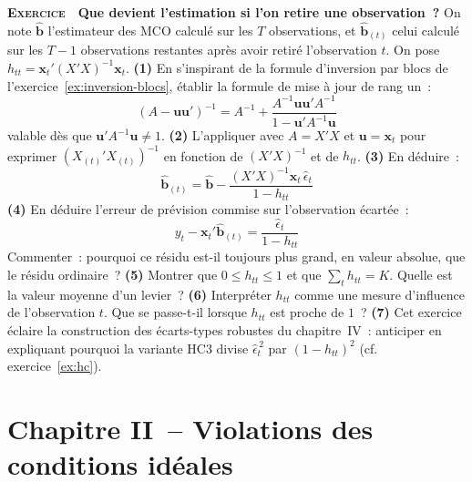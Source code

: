 \documentclass[10pt,a4paper,notitlepage]{article}
\newcounter{xnumber}
\newcommand{\exercice}{\refstepcounter{xnumber}\textsc{\textbf{Exercice}} \textbf{\thexnumber}\,\,}
\newcommand{\question}[1]{\textbf{(#1)}}
\begin{document}
\exercice\label{ex:leave-one-out} \textbf{Que devient l'estimation si l'on
retire une observation~?} On note $\hat{\mathbf b}$ l'estimateur des MCO calculé
sur les $T$ observations, et $\hat{\mathbf b}_{(t)}$ celui calculé sur les
$T-1$ observations restantes après avoir retiré l'observation $t$. On pose
$h_{tt} = \mathbf x_t'(X'X)^{-1}\mathbf x_t$. \question{1} En s'inspirant de la
formule d'inversion par blocs de l'exercice~\ref{ex:inversion-blocs}, établir la
formule de mise à jour de rang un~:
\[
  \left(A-\mathbf u\mathbf u'\right)^{-1} = A^{-1} + \frac{A^{-1}\mathbf u\mathbf u'A^{-1}}{1-\mathbf u'A^{-1}\mathbf u}
\]
valable dès que $\mathbf u'A^{-1}\mathbf u\neq1$. \question{2} L'appliquer avec
$A = X'X$ et $\mathbf u = \mathbf x_t$ pour exprimer
$\left(X_{(t)}'X_{(t)}\right)^{-1}$ en fonction de $(X'X)^{-1}$ et de $h_{tt}$.
\question{3} En déduire~:
\[
  \hat{\mathbf b}_{(t)} = \hat{\mathbf b} - \frac{(X'X)^{-1}\mathbf x_t\,\hat\epsilon_t}{1-h_{tt}}
\]
\question{4} En déduire l'erreur de prévision commise sur l'observation
écartée~:
\[
  y_t - \mathbf x_t'\hat{\mathbf b}_{(t)} = \frac{\hat\epsilon_t}{1-h_{tt}}
\]
Commenter~: pourquoi ce résidu est-il toujours plus grand, en valeur absolue,
que le résidu ordinaire~? \question{5} Montrer que $0\leq h_{tt}\leq 1$ et que
$\sum_t h_{tt} = K$. Quelle est la valeur moyenne d'un levier~? \question{6}
Interpréter $h_{tt}$ comme une mesure d'influence de l'observation $t$. Que se
passe-t-il lorsque $h_{tt}$ est proche de $1$~? \question{7} Cet exercice éclaire
la construction des écarts-types robustes du chapitre~IV~: anticiper en
expliquant pourquoi la variante HC3 divise $\hat\epsilon_t^{\,2}$ par
$(1-h_{tt})^2$ (cf. exercice~\ref{ex:hc}).\newline

\bigskip

\section*{Chapitre II~-- Violations des conditions idéales}
\end{document}
